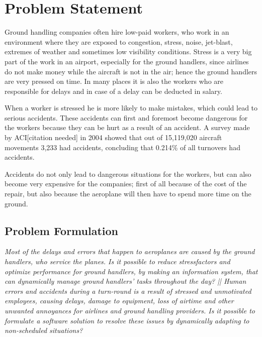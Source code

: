 \chapter{Problem Statement}

Ground handling companies often hire low-paid workers, who work in an environment where they are exposed to congestion, stress, noise, jet-blast, extremes of weather and sometimes low visibility conditions. Stress is a very big part of the work in an airport, especially for the ground handlers, since airlines do not make money while the aircraft is not in the air; hence the ground handlers are very pressed on time.  In many places it is also the workers who are responsible for delays and in case of a delay can be deducted in salary.

When a worker is stressed he is more likely to make mistakes, which could lead to serious accidents. These accidents can first and foremost become dangerous for the workers because they can be hurt as a result of an accident. A survey made by ACI[citation needed] in 2004 showed that out of 15,119,020 aircraft movements 3,233 had accidents, concluding that 0.214\% of all turnovers had accidents.

Accidents do not only lead to dangerous situations for the workers, but can also become very expensive for the companies; first of all because of the cost of the repair, but also because the aeroplane will then have to spend more time on the ground.
\section{Problem Formulation}
\begin{center}
\textit{Most of the delays and errors that happen to aeroplanes are caused by the ground handlers, who service the planes. Is it possible to reduce stressfactors and optimize performance for ground handlers, by making an information system, that can dynamically manage ground handlers' tasks throughout the day? || Human errors and accidents during a turn-round is a result of stressed and unmotivated employees, causing delays, damage to equipment, loss of airtime and other unwanted annoyances for airlines and ground handling providers. Is it possible to formulate a software solution to resolve these issues by dynamically adapting to non-scheduled situations?}
\end{center}
